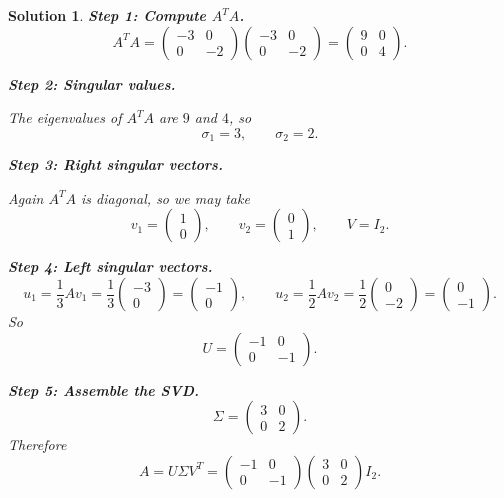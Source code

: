 \documentclass[11pt,a4paper]{article}
\theoremstyle{sol}
\newtheorem*{solution}{Solution}
\begin{document}
\begin{solution}
\textbf{Step 1: Compute $A^TA$.}
\[
A^TA=
\begin{pmatrix}-3&0\\0&-2\end{pmatrix}
\begin{pmatrix}-3&0\\0&-2\end{pmatrix}
=
\begin{pmatrix}9&0\\0&4\end{pmatrix}.
\]

\textbf{Step 2: Singular values.}

The eigenvalues of $A^TA$ are $9$ and $4$, so
\[
\sigma_1=3,\qquad \sigma_2=2.
\]

\textbf{Step 3: Right singular vectors.}

Again $A^TA$ is diagonal, so we may take
\[
v_1=\begin{pmatrix}1\\0\end{pmatrix},
\qquad
v_2=\begin{pmatrix}0\\1\end{pmatrix},
\qquad
V=I_2.
\]

\textbf{Step 4: Left singular vectors.}
\[
u_1=\frac{1}{3}Av_1
=\frac{1}{3}\begin{pmatrix}-3\\0\end{pmatrix}
=\begin{pmatrix}-1\\0\end{pmatrix},
\qquad
u_2=\frac{1}{2}Av_2
=\frac{1}{2}\begin{pmatrix}0\\-2\end{pmatrix}
=\begin{pmatrix}0\\-1\end{pmatrix}.
\]
So
\[
U=
\begin{pmatrix}
-1&0\\
0&-1
\end{pmatrix}.
\]

\textbf{Step 5: Assemble the SVD.}
\[
\Sigma=\begin{pmatrix}3&0\\0&2\end{pmatrix}.
\]
Therefore
\[
\boxed{
A=U\Sigma V^T=
\begin{pmatrix}
-1&0\\
0&-1
\end{pmatrix}
\begin{pmatrix}
3&0\\
0&2
\end{pmatrix}
I_2.
}
\]
\end{solution}
\end{document}
